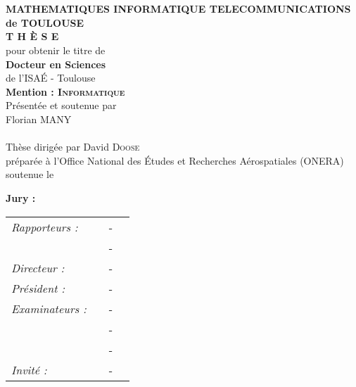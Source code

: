 \begin{titlepage}
\begin{center}
 \\
\vspace*{0.3cm}
 \\
\noindent \textbf{MATHEMATIQUES INFORMATIQUE TELECOMMUNICATIONS de TOULOUSE} \\
\vspace*{0.5cm}
\noindent \Huge \textbf{T H È S E} \\
\vspace*{0.3cm}
\noindent \large {pour obtenir le titre de} \\
\vspace*{0.3cm}
\noindent \LARGE \textbf{Docteur en Sciences} \\
\vspace*{0.3cm}
\noindent \Large de l'ISA\'E - Toulouse \\
\noindent \Large \textbf{Mention : \textsc{Informatique}}\\
\vspace*{0.4cm}
\noindent \large {Présentée et soutenue par\\}
\noindent \LARGE Florian \textsc{MANY} \\
\vspace*{0.8cm}
 \\
\vspace*{0.8cm}
\noindent \Large Thèse dirigée par David  \textsc{Doose} \\
\vspace*{0.2cm}
\noindent \Large préparée à l'Office National des \'Etudes et Recherches Aérospatiales (ONERA)\\
\vspace*{0.2cm}
\noindent \large soutenue le  \\
\vspace*{0.5cm}
\end{center}
\noindent \large \textbf{Jury :} \\
\begin{center}
\noindent \large
\begin{tabular}{llcl}
      \textit{Rapporteurs :}	&		& - & \\
				& 	& - & \\
      \textit{Directeur :}	& 		& - & \\
      \textit{Président :}	& 		& - & \\
      \textit{Examinateurs :}   &        & - & \\
      				& 			& - & \\
      				& 		& - & \\
      \textit{Invité :}		& 		& - &
\end{tabular}
\end{center}
\end{titlepage}
\sloppy

\titlepage

